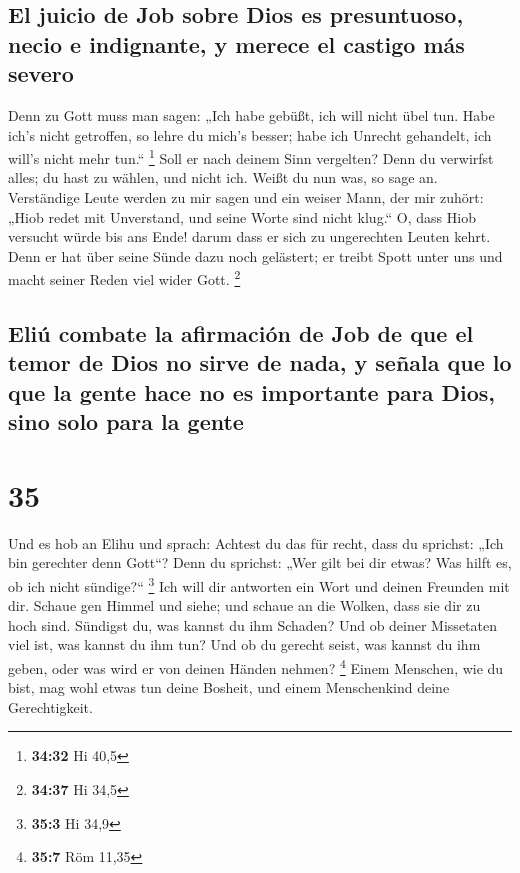 \hypertarget{el-juicio-de-job-sobre-dios-es-presuntuoso-necio-e-indignante-y-merece-el-castigo-muxe1s-severo}{%
\subsection{El juicio de Job sobre Dios es presuntuoso, necio e
indignante, y merece el castigo más
severo}\label{el-juicio-de-job-sobre-dios-es-presuntuoso-necio-e-indignante-y-merece-el-castigo-muxe1s-severo}}

 Denn zu Gott muss man sagen: „Ich habe gebüßt, ich will
nicht übel tun.  Habe ich's nicht getroffen, so lehre du
mich's besser; habe ich Unrecht gehandelt, ich will's nicht mehr tun.``
\footnote{\textbf{34:32} Hi 40,5}  Soll er nach deinem
Sinn vergelten? Denn du verwirfst alles; du hast zu wählen, und nicht
ich. Weißt du nun was, so sage an.  Verständige Leute
werden zu mir sagen und ein weiser Mann, der mir zuhört: 
„Hiob redet mit Unverstand, und seine Worte sind nicht klug.``
 O, dass Hiob versucht würde bis ans Ende! darum dass er
sich zu ungerechten Leuten kehrt.  Denn er hat über seine
Sünde dazu noch gelästert; er treibt Spott unter uns und macht seiner
Reden viel wider Gott. \footnote{\textbf{34:37} Hi 34,5}

\hypertarget{eliuxfa-combate-la-afirmaciuxf3n-de-job-de-que-el-temor-de-dios-no-sirve-de-nada-y-seuxf1ala-que-lo-que-la-gente-hace-no-es-importante-para-dios-sino-solo-para-la-gente}{%
\subsection{Eliú combate la afirmación de Job de que el temor de Dios no
sirve de nada, y señala que lo que la gente hace no es importante para
Dios, sino solo para la
gente}\label{eliuxfa-combate-la-afirmaciuxf3n-de-job-de-que-el-temor-de-dios-no-sirve-de-nada-y-seuxf1ala-que-lo-que-la-gente-hace-no-es-importante-para-dios-sino-solo-para-la-gente}}

\hypertarget{section-34}{%
\section{35}\label{section-34}}

 Und es hob an Elihu und sprach:  Achtest du
das für recht, dass du sprichst: „Ich bin gerechter denn Gott``?
 Denn du sprichst: „Wer gilt bei dir etwas? Was hilft es,
ob ich nicht sündige?{}`` \footnote{\textbf{35:3} Hi 34,9}
 Ich will dir antworten ein Wort und deinen Freunden mit
dir.  Schaue gen Himmel und siehe; und schaue an die
Wolken, dass sie dir zu hoch sind.  Sündigst du, was
kannst du ihm Schaden? Und ob deiner Missetaten viel ist, was kannst du
ihm tun?  Und ob du gerecht seist, was kannst du ihm
geben, oder was wird er von deinen Händen nehmen? \footnote{\textbf{35:7}
  Röm 11,35}  Einem Menschen, wie du bist, mag wohl etwas
tun deine Bosheit, und einem Menschenkind deine Gerechtigkeit.

